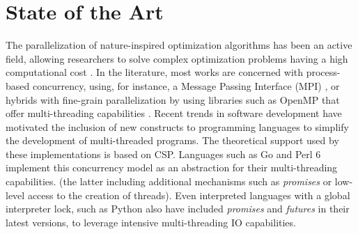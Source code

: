 \documentclass[runningheads]{llncs}\usepackage[]{graphicx}\usepackage[]{color}
\begin{document}
\section{State of the Art}

The parallelization of nature-inspired
optimization algorithms has been an active field, allowing researchers 
to solve complex optimization problems having a high computational 
cost \cite{Lalwani2019}. In the literature, most works are concerned 
with process-based concurrency, using, for instance, a Message Passing Interface 
(MPI) \cite{gropp1999using}, or hybrids with fine-grain
parallelization by using libraries such as OpenMP \cite{dagum1998openmp}
that offer multi-threading capabilities \cite{jin2011high}. Recent trends
in software development have motivated the inclusion of new 
constructs to programming languages to simplify
the development of multi-threaded programs. The theoretical support 
used by these implementations is based on CSP. Languages such as Go 
and Perl 6 implement this concurrency model as an abstraction for 
their multi-threading capabilities. (the latter including additional mechanisms such as 
{\em promises} or low-level access to the creation of threads). Even 
interpreted languages with a global interpreter lock, such as Python also
have included {\em promises} and {\em futures} in their latest versions,
to leverage intensive multi-threading IO capabilities.






\end{document}
